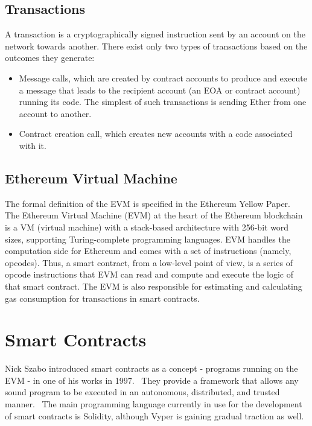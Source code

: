     \subsection{Transactions}
    A transaction is a cryptographically signed instruction sent by an account on the network towards another.
    There exist only two types of transactions based on the outcomes they generate:
    \begin{itemize}
        \item Message calls, which are created by contract accounts to produce and execute a message that leads to the recipient account (an EOA or contract account) running its code. The simplest of such transactions is sending Ether from one account to another.
        \item Contract creation call, which creates new accounts with a code associated with it.
    \end{itemize}
    

    \subsection{Ethereum Virtual Machine}
        The formal definition of the EVM is specified in the Ethereum Yellow Paper.~\cite{wood2014ethereum}
        The Ethereum Virtual Machine (EVM) at the heart of the Ethereum blockchain is a VM (virtual machine) with a stack-based architecture with 256-bit word sizes, supporting Turing-complete programming languages.
        EVM handles the computation side for Ethereum and comes with a set of instructions (namely, opcodes).
        Thus, a smart contract, from a low-level point of view, is a series of opcode instructions that EVM can read and compute and execute the logic of that smart contract.
        The EVM is also responsible for estimating and calculating gas consumption for transactions in smart contracts.


\section{Smart Contracts}
    Nick Szabo introduced smart contracts as a concept - programs running on the EVM - in one of his works in 1997.~\cite{szabo1997formalizing}
    They provide a framework that allows any sound program to be executed in an autonomous, distributed, and trusted manner.~\cite{nguyen2020sfuzz}
    The main programming language currently in use for the development of smart contracts is Solidity, although Vyper is gaining gradual traction as well.

